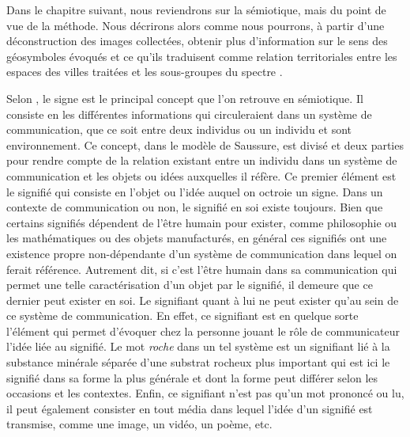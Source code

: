 Dans le chapitre suivant, nous reviendrons sur la sémiotique, mais du point de vue de la méthode. 
Nous décrirons alors comme nous pourrons, à partir d'une déconstruction des images collectées, obtenir plus d'information sur le sens des géosymboles évoqués et ce qu'ils traduisent comme relation territoriales entre les espaces des villes traitées et les sous-groupes du spectre \lgbt{}.

Selon \citet[113][]{Rose2012}, le signe est le principal concept que l'on retrouve en sémiotique. 
Il consiste en les différentes informations qui circuleraient dans un système de communication, que ce soit entre deux individus ou un individu et sont environnement. 
Ce concept, dans le modèle de Saussure, est divisé et deux parties pour rendre compte de la relation existant entre un individu dans un système de communication et les objets ou idées auxquelles il réfère. 
Ce premier élément est le signifié qui consiste en l'objet ou l'idée auquel on octroie un signe. 
Dans un contexte de communication ou non, le signifié en soi existe toujours. 
Bien que certains signifiés dépendent de l'être humain pour exister, comme philosophie ou les mathématiques ou des objets manufacturés, en général ces signifiés ont une existence propre non-dépendante d'un système de communication dans lequel on ferait référence. 
Autrement dit, si c'est l'être humain dans sa communication qui permet une telle caractérisation d'un objet par le signifié, il demeure que ce dernier peut exister en soi. 
Le signifiant quant à lui ne peut exister qu'au sein de ce système de communication. 
En effet, ce signifiant est en quelque sorte l'élément qui permet d'évoquer chez la personne jouant le rôle de communicateur l'idée liée au signifié. 
Le mot \emph{roche} dans un tel système est un signifiant lié à la substance minérale séparée d'une substrat rocheux plus important qui est ici le signifié dans sa forme la plus générale et dont la forme peut différer selon les occasions et les contextes. 
Enfin, ce signifiant n'est pas qu'un mot prononcé ou lu, il peut également consister en tout média dans lequel l'idée d'un signifié est transmise, comme une image, un vidéo, un poème, etc.

